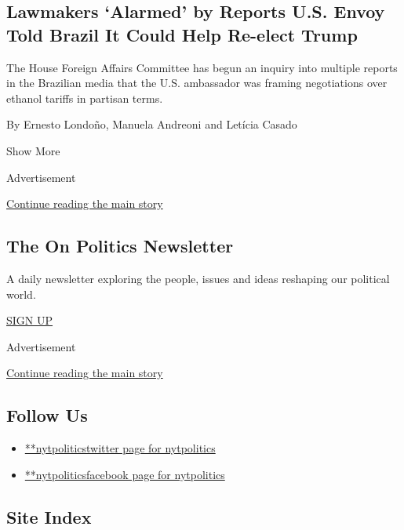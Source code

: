 \begin{enumerate}
  \hypertarget{lawmakers-alarmed-by-reports-us-envoy-told-brazil-it-could-help-re-elect-trump}{%
  \subsection{Lawmakers `Alarmed' by Reports U.S. Envoy Told Brazil It
  Could Help Re-elect
  Trump}\label{lawmakers-alarmed-by-reports-us-envoy-told-brazil-it-could-help-re-elect-trump}}

  The House Foreign Affairs Committee has begun an inquiry into multiple
  reports in the Brazilian media that the U.S. ambassador was framing
  negotiations over ethanol tariffs in partisan terms.

  By Ernesto Londoño, Manuela Andreoni and Letícia Casado
\end{enumerate}

Show More

Advertisement

\protect\hyperlink{after-mid2}{Continue reading the main story}

\hypertarget{the-on-politics-newsletter}{%
\subsection{The On Politics
Newsletter}\label{the-on-politics-newsletter}}

A daily newsletter exploring the people, issues and ideas reshaping our
political world.

\href{/newsletters/signup/CN}{SIGN UP}

Advertisement

\protect\hyperlink{after-mktg}{Continue reading the main story}

\hypertarget{follow-us}{%
\subsection{Follow Us}\label{follow-us}}

\begin{itemize}
\tightlist
\item
  \href{https://twitter.com/nytpolitics}{**nytpoliticstwitter page for
  nytpolitics}
\item
  \href{https://www.facebook.com/nytpolitics}{**nytpoliticsfacebook page
  for nytpolitics}
\end{itemize}

\hypertarget{site-index}{%
\subsection{Site Index}\label{site-index}}

